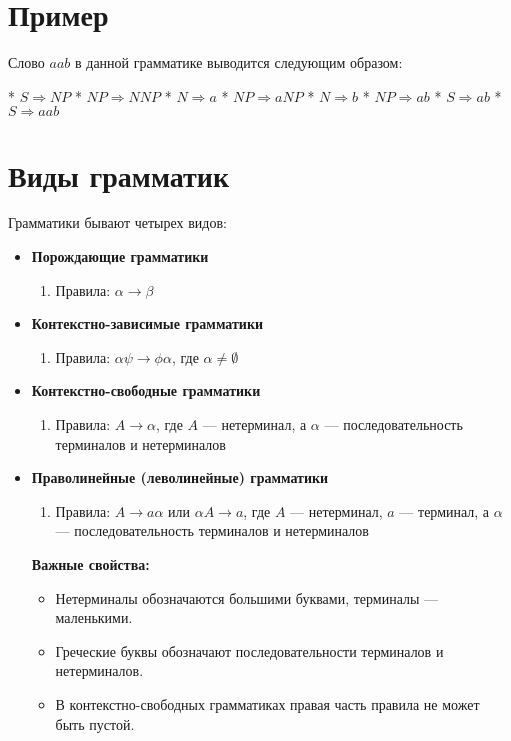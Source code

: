\documentclass{article}
\begin{document}
\begin{itemize}
\section{Пример}

Слово $aab$ в данной грамматике выводится следующим образом:

* $S \Rightarrow NP$
* $NP \Rightarrow N NP$
* $N \Rightarrow a$
* $NP \Rightarrow a NP$
* $N \Rightarrow b$
* $NP \Rightarrow ab$
* $S \Rightarrow ab$
* $S \Rightarrow aab$
\section{Виды грамматик}

Грамматики бывают четырех видов:

\begin{itemize}
    \item \textbf{Порождающие грамматики}
    \begin{enumerate}
        \item Правила: $\alpha \rightarrow \beta$
    \end{enumerate}

    \item \textbf{Контекстно-зависимые грамматики}
    \begin{enumerate}
        \item Правила: $\alpha \psi \rightarrow \phi \alpha$, где $\alpha \neq \emptyset$
    \end{enumerate}

    \item \textbf{Контекстно-свободные грамматики}
    \begin{enumerate}
        \item Правила: $A \rightarrow \alpha$, где $A$ — нетерминал, а $\alpha$ — последовательность терминалов и нетерминалов
    \end{enumerate}

    \item \textbf{Праволинейные (леволинейные) грамматики}
    \begin{enumerate}
        \item Правила: $A \rightarrow a \alpha$ или $\alpha A \rightarrow a$, где $A$ — нетерминал, $a$ — терминал, а $\alpha$ — последовательность терминалов и нетерминалов
    \end{enumerate}

\textbf{Важные свойства:}

\begin{itemize}
    \item Нетерминалы обозначаются большими буквами, терминалы — маленькими.
    \item Греческие буквы обозначают последовательности терминалов и нетерминалов.
    \item В контекстно-свободных грамматиках правая часть правила не может быть пустой.
\end{itemize}

\end{itemize}
\end{itemize}
\end{document}

